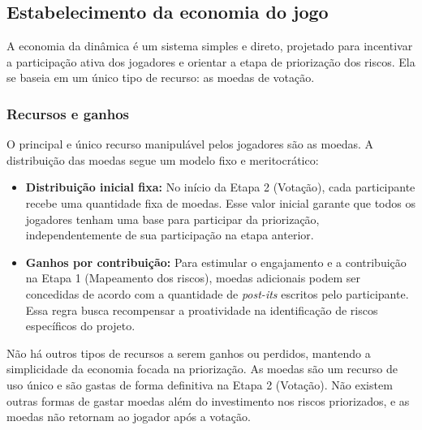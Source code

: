 \documentclass[
	12pt,
	openright,
	twoside,
	a4paper,
	english,
	brazil
	]{abntex2}
\begin{document}
\subsection{Estabelecimento da economia do jogo}
\label{sec:economia-jogo}

A economia da dinâmica é um sistema simples e direto, projetado para incentivar a participação ativa dos jogadores e orientar a etapa de priorização dos riscos. Ela se baseia em um único tipo de recurso: as moedas de votação.

\subsubsection{Recursos e ganhos}
O principal e único recurso manipulável pelos jogadores são as moedas. A distribuição das moedas segue um modelo fixo e meritocrático:
\begin{itemize}
\item \textbf{Distribuição inicial fixa:} No início da Etapa 2 (Votação), cada participante recebe uma quantidade fixa de moedas. Esse valor inicial garante que todos os jogadores tenham uma base para participar da priorização, independentemente de sua participação na etapa anterior.
\item \textbf{Ganhos por contribuição:} Para estimular o engajamento e a contribuição na Etapa 1 (Mapeamento dos riscos), moedas adicionais podem ser concedidas de acordo com a quantidade de \textit{post-its} escritos pelo participante. Essa regra busca recompensar a proatividade na identificação de riscos específicos do projeto.
\end{itemize}
Não há outros tipos de recursos a serem ganhos ou perdidos, mantendo a simplicidade da economia focada na priorização. As moedas são um recurso de uso único e são gastas de forma definitiva na Etapa 2 (Votação). Não existem outras formas de gastar moedas além do investimento nos riscos priorizados, e as moedas não retornam ao jogador após a votação.
\end{document}

